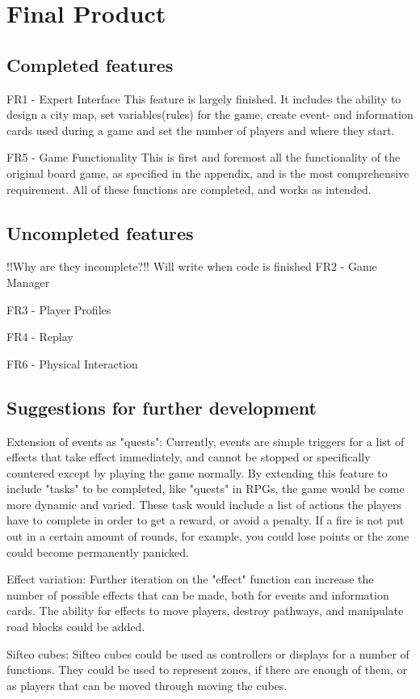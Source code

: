\chapter{Final Product}

\section{Completed features}
FR1 - Expert Interface
This feature is largely finished. It includes the ability to design a city map, set variables(rules) for the game, create event- and information cards used during a game and set the number of players and where they start.

FR5 - Game Functionality
This is first and foremost all the functionality of the original board game, as specified in the appendix, and is the most comprehensive requirement. All of these functions are completed, and works as intended.



\section{Uncompleted features}

!!Why are they incomplete?!! Will write when code is finished
FR2 - Game Manager

FR3 - Player Profiles

FR4 - Replay

FR6 - Physical Interaction


\section{Suggestions for further development}

Extension of events as "quests":
Currently, events are simple triggers for a list of effects that take effect immediately, and cannot be stopped or specifically countered except by playing the game normally. By extending this feature to include "tasks" to be completed, like "quests" in RPGs, the game would be come more dynamic and varied. These task would include a list of actions the players have to complete in order to get a reward, or avoid a penalty. If a fire is not put out in a certain amount of rounds, for example, you could lose points or the zone could become permanently panicked.

Effect variation:
Further iteration on the "effect" function can increase the number of possible effects that can be made, both for events and information cards. The ability for effects to move players, destroy pathways, and manipulate road blocks could be added.

Sifteo cubes:
Sifteo cubes could be used as controllers or displays for a number of functions. They could be used to represent zones, if there are enough of them, or as players that can be moved through moving the cubes. 




